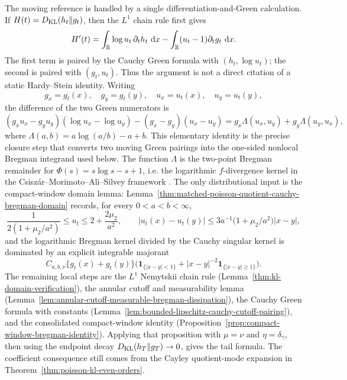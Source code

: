 The moving reference is handled by a single differentiation-and-Green
calculation.  If
\(H(t)=D_{\rm KL}(h_t\|g_t)\), then the \(L^1\) chain rule first gives
\begin{equation}\label{eq:section4-two-pair-chain-rule}
H'(t)=\int_{\mathbb{R}}\log u_t\,\partial_t h_t\,\,\mathrm{d} x
-\int_{\mathbb{R}}(u_t-1)\partial_tg_t\,\,\mathrm{d} x .
\end{equation}
The first term is paired by the Cauchy Green formula with
\((h_t,\log u_t)\); the second is paired with \((g_t,u_t)\).  Thus the
argument is not a direct citation of a static Hardy--Stein identity.  Writing
\[
g_x=g_t(x),\quad g_y=g_t(y),\quad
u_x=u_t(x),\quad u_y=u_t(y),
\]
the difference of the two Green numerators is
\begin{equation}\label{eq:section4-two-green-numerator-difference}
(g_xu_x-g_yu_y)(\log u_x-\log u_y)
-(g_x-g_y)(u_x-u_y)
=g_x\Lambda(u_x,u_y)+g_y\Lambda(u_y,u_x),
\end{equation}
where \(\Lambda(a,b)=a\log(a/b)-a+b\).  This elementary identity is the
precise closure step that converts two moving Green pairings into the
one-sided nonlocal Bregman integrand used below.  The function
\(\Lambda\) is the two-point Bregman remainder for
\(\Phi(s)=s\log s-s+1\), i.e. the logarithmic
\(f\)-divergence kernel in the Csisz{\'a}r--Morimoto--Ali--Silvey framework
\cite{AliSilvey1966Divergence,Csiszar1967,Morimoto1963Markov,
Vajda1989TheoryDivergence,Bregman1967}.  The only distributional input is the
compact-window domain lemma:
Lemma~\ref{thm:matched-poisson-quotient-cauchy-bregman-domain} records, for
every \(0<a<b<\infty\),
\[
\frac{1}{2(1+\mu_2/a^2)}\le u_t\le
2+\frac{2\mu_2}{a^2},\qquad
|u_t(x)-u_t(y)|\le
3a^{-1}\bigl(1+\mu_2/a^2\bigr)|x-y|,
\]
and the logarithmic Bregman kernel divided by the Cauchy singular kernel is
dominated by an explicit integrable majorant
\[
C_{a,b,\nu}\{g_t(x)+g_t(y)\}
\bigl(\mathbf1_{\{|x-y|<1\}}+|x-y|^{-2}\mathbf1_{\{|x-y|\ge1\}}\bigr).
\]
The remaining local steps are the \(L^1\) Nemytskii chain rule
(Lemma~\ref{thm:kl-domain-verification}), the annular cutoff and
measurability lemma
(Lemma~\ref{lem:annular-cutoff-measurable-bregman-dissipation}), the Cauchy
Green formula with constants
(Lemma~\ref{lem:bounded-lipschitz-cauchy-cutoff-pairing}), and the
consolidated compact-window identity
(Proposition~\ref{prop:compact-window-bregman-identity}).  Applying that
proposition with \(\mu=\nu\) and \(\eta=\delta_{\bar\gamma}\), then using
the endpoint decay \(D_{\rm KL}(h_T\|g_T)\to0\), gives the tail formula.
The coefficient consequence still comes from the Cayley quotient-mode
expansion in Theorem~\ref{thm:poisson-kl-even-orders}.

